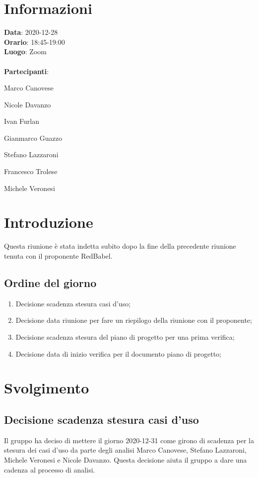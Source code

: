 \section{Informazioni}
\textbf{Data}: 2020-12-28\\
\textbf{Orario}: 18:45-19:00\\
\textbf{Luogo}: Zoom\\\\
\textbf{Partecipanti}:\begin{list}{*}{\setlength{\itemsep}{0cm}}
	\item Marco Canovese
	\item Nicole Davanzo
	\item Ivan Furlan
	\item Gianmarco Guazzo
	\item Stefano Lazzaroni
	\item Francesco Trolese
	\item Michele Veronesi
\end{list}

\section{Introduzione}
Questa riunione è stata indetta subito dopo la fine della precedente riunione tenuta con il proponente RedBabel.

\subsection{Ordine del giorno}
\begin{enumerate}
    \item Decisione scadenza stesura casi d'uso;
    \item Decisione data riunione per fare un riepilogo della riunione con il proponente;
    \item Decisione scadenza stesura del piano di progetto per una prima verifica;
    \item Decisione data di inizio verifica per il documento piano di progetto;
\end{enumerate}

\section{Svolgimento}
\subsection{Decisione scadenza stesura casi d'uso} 
Il gruppo ha deciso di mettere il giorno 2020-12-31 come girono di scadenza per la stesura dei casi d'uso da parte degli analisi Marco Canovese, Stefano Lazzaroni, Michele Veronesi e Nicole Davanzo. Questa decisione aiuta il gruppo a dare una cadenza al processo di analisi. 

